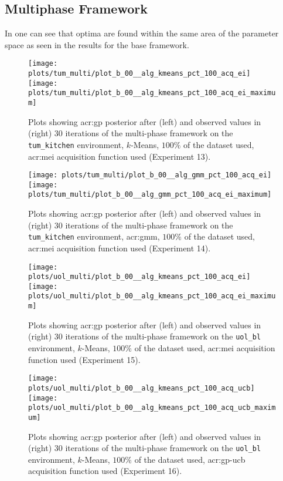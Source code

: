 \newpage

\subsection{Multiphase Framework}
\label{sec:multiphase-framework-results}

In  one can see that optima are found within the same area of the parameter space as seen in the results for the base framework.

\vspace{12pt}
\noindent{}

\begin{figure}[t!]
	\centering
	\texttt{[image: plots/tum\_multi/plot\_b\_00\_\_alg\_kmeans\_pct\_100\_acq\_ei]}
	\texttt{[image: plots/tum\_multi/plot\_b\_00\_\_alg\_kmeans\_pct\_100\_acq\_ei\_maximum]}
	\caption{Plots showing \acrshort{acr:gp} posterior after (left) and observed values in (right) 30 iterations of the multi-phase framework on the \texttt{tum\_kitchen} environment, $k$-Means, $100\%$ of the dataset used, \acrshort{acr:mei} acquisition function used (Experiment 13).}
	\label{fig:exp13}
\end{figure}
\begin{figure}[t!]
	\centering
	\texttt{[image: plots/tum\_multi/plot\_b\_00\_\_alg\_gmm\_pct\_100\_acq\_ei]}
	\texttt{[image: plots/tum\_multi/plot\_b\_00\_\_alg\_gmm\_pct\_100\_acq\_ei\_maximum]}
	\caption{Plots showing \acrshort{acr:gp} posterior after (left) and observed values in (right) 30 iterations of the multi-phase framework on the \texttt{tum\_kitchen} environment, \acrshort{acr:gmm}, $100\%$ of the dataset used, \acrshort{acr:mei} acquisition function used (Experiment 14).}
	\label{fig:exp14}
\end{figure}%

\begin{figure}[t!]
	\centering
	\texttt{[image: plots/uol\_multi/plot\_b\_00\_\_alg\_kmeans\_pct\_100\_acq\_ei]}
	\texttt{[image: plots/uol\_multi/plot\_b\_00\_\_alg\_kmeans\_pct\_100\_acq\_ei\_maximum]}
	\caption{Plots showing \acrshort{acr:gp} posterior after (left) and observed values in (right) 30 iterations of the multi-phase framework on the \texttt{uol\_bl} environment, $k$-Means, $100\%$ of the dataset used, \acrshort{acr:mei} acquisition function used (Experiment 15).}
	\label{fig:exp15}
\end{figure}
\begin{figure}[t!]
	\centering
	\texttt{[image: plots/uol\_multi/plot\_b\_00\_\_alg\_kmeans\_pct\_100\_acq\_ucb]}
	\texttt{[image: plots/uol\_multi/plot\_b\_00\_\_alg\_kmeans\_pct\_100\_acq\_ucb\_maximum]}
	\caption{Plots showing \acrshort{acr:gp} posterior after (left) and observed values in (right) 30 iterations of the multi-phase framework on the \texttt{uol\_bl} environment, $k$-Means, $100\%$ of the dataset used, \acrshort{acr:gp-ucb} acquisition function used (Experiment 16).}
	\label{fig:exp16}
\end{figure}


